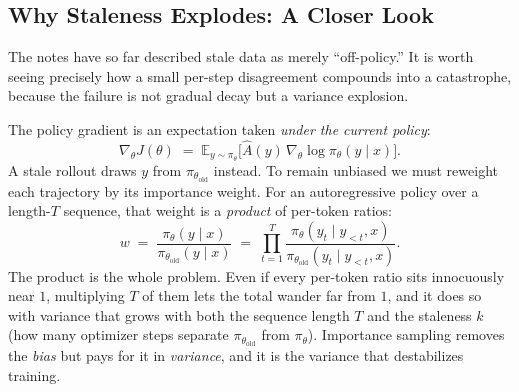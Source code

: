 \documentclass[11pt,a4paper]{article}
\theoremstyle{definition}
\theoremstyle{plain}
\newcommand{\E}{\mathbb{E}}
\newcommand{\policy}{\pi_\theta}
\newcommand{\oldpolicy}{\pi_{\theta_{\text{old}}}}
\begin{document}
\begin{center}
\end{center}

\subsection{Why Staleness Explodes: A Closer Look}

The notes have so far described stale data as merely ``off-policy.'' It is
worth seeing precisely how a small per-step disagreement compounds into a
catastrophe, because the failure is not gradual decay but a variance
explosion.

The policy gradient is an expectation taken \emph{under the current policy}:
\begin{equation}
  \nabla_\theta J(\theta)
  \;=\; \E_{y \sim \policy}\!\bigl[\hat A(y)\,\nabla_\theta \log \policy(y\mid x)\bigr].
\end{equation}
A stale rollout draws $y$ from $\oldpolicy$ instead. To remain unbiased we
must reweight each trajectory by its importance weight. For an
autoregressive policy over a length-$T$ sequence, that weight is a
\emph{product} of per-token ratios:
\begin{equation}
  w \;=\; \frac{\policy(y\mid x)}{\oldpolicy(y\mid x)}
        \;=\; \prod_{t=1}^{T}
              \frac{\policy(y_t \mid y_{<t},x)}{\oldpolicy(y_t \mid y_{<t},x)}.
  \label{eq:isw-product}
\end{equation}
The product is the whole problem. Even if every per-token ratio sits
innocuously near $1$, multiplying $T$ of them lets the total wander far from
$1$, and it does so with variance that grows with both the sequence length
$T$ and the staleness $k$ (how many optimizer steps separate $\oldpolicy$
from $\policy$). Importance sampling removes the \emph{bias} but pays for it
in \emph{variance}, and it is the variance that destabilizes training.
\end{document}
